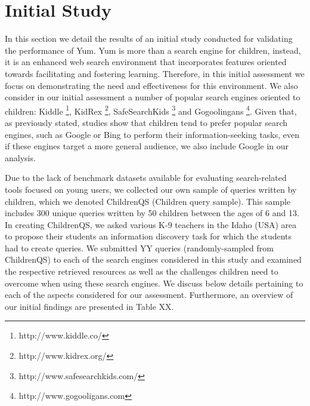 \documentclass{sig-alternate-05-2015}
\begin{document}
\section{Initial Study}
In this section we detail the results of an initial study conducted for validating the performance of Yum. Yum is more than a search engine for children, instead, it is an enhanced web search environment that incorporates features oriented towards facilitating and fostering learning. Therefore, in this initial assessment we focus on demonstrating the need and effectiveness for this environment. We also consider in our initial assessment a number of popular search engines oriented to children:  Kiddle \footnote{ http://www.kiddle.co/}, KidRex \footnote{http://www.kidrex.org/}, SafeSearchKids \footnote{ http://www.safesearchkids.com/} and Gogoolingans \footnote{http://www.gogooligans.com}. Given that, as previously stated, studies show that children tend to prefer popular search engines, such as Google or Bing to perform their information-seeking tasks\cite{bil13}, even if these engines target a more general audience, we also include Google in our analysis. 

Due to the lack of benchmark datasets available for evaluating search-related tools focused on young users, we collected our own sample of queries written by children, which we denoted ChildrenQS (Children query sample). This sample includes 300 unique queries written by 50 children between the ages of 6 and 13. In creating ChildrenQS, we asked various K-9   teachers in the Idaho (USA) area to propose their students an information discovery task for which the students had to create queries. 
We submitted YY queries (randomly-sampled from ChildrenQS) to each of the search engines considered in this study and examined the respective retrieved resources as well as the challenges children need to overcome when using these search engines. We discuss below details pertaining to each of the aspects  considered for our assessment. Furthermore, an overview of our initial findings are presented in Table XX. \\
\end{document}
